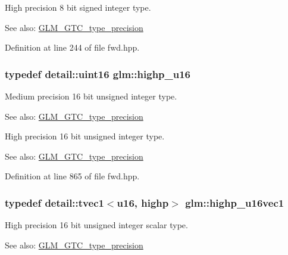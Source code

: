 High precision 8 bit signed integer type. \begin{Desc}
\item[See also:]\hyperlink{group__gtc__type__precision}{GLM\_\-GTC\_\-type\_\-precision} \end{Desc}


Definition at line 244 of file fwd.hpp.\hypertarget{group__gtc__type__precision_g9da2178d7501d9c0f225fa1a7b70cb45}{
\subsubsection[highp\_\-u16]{\setlength{\rightskip}{0pt plus 5cm}typedef detail::uint16 {\bf glm::highp\_\-u16}}}
\label{group__gtc__type__precision_g9da2178d7501d9c0f225fa1a7b70cb45}


Medium precision 16 bit unsigned integer type. \begin{Desc}
\item[See also:]\hyperlink{group__gtc__type__precision}{GLM\_\-GTC\_\-type\_\-precision}\end{Desc}
High precision 16 bit unsigned integer type. \begin{Desc}
\item[See also:]\hyperlink{group__gtc__type__precision}{GLM\_\-GTC\_\-type\_\-precision} \end{Desc}


Definition at line 865 of file fwd.hpp.\hypertarget{group__gtc__type__precision_gc4a83dec879b77ab0055c8da232da066}{
\subsubsection[highp\_\-u16vec1]{\setlength{\rightskip}{0pt plus 5cm}typedef detail::tvec1$<$u16, highp$>$ {\bf glm::highp\_\-u16vec1}}}
\label{group__gtc__type__precision_gc4a83dec879b77ab0055c8da232da066}


High precision 16 bit unsigned integer scalar type. \begin{Desc}
\item[See also:]\hyperlink{group__gtc__type__precision}{GLM\_\-GTC\_\-type\_\-precision} \end{Desc}


